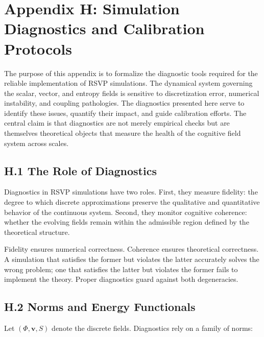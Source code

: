 \documentclass[12pt]{article}
\begin{document}
\newpage
\section*{Appendix H: Simulation Diagnostics and Calibration Protocols}

The purpose of this appendix is to formalize the diagnostic tools required for 
the reliable implementation of RSVP simulations.  
The dynamical system governing the scalar, vector, and entropy fields is 
sensitive to discretization error, numerical instability, and coupling 
pathologies.  
The diagnostics presented here serve to identify these issues, quantify their 
impact, and guide calibration efforts.  
The central claim is that diagnostics are not merely empirical checks but are 
themselves theoretical objects that measure the health of the cognitive field 
system across scales.

\subsection*{H.1 The Role of Diagnostics}

Diagnostics in RSVP simulations have two roles.  
First, they measure fidelity: the degree to which discrete approximations 
preserve the qualitative and quantitative behavior of the continuous system.  
Second, they monitor cognitive coherence: whether the evolving fields remain 
within the admissible region defined by the theoretical structure.

Fidelity ensures numerical correctness.  
Coherence ensures theoretical correctness.  
A simulation that satisfies the former but violates the latter accurately 
solves the wrong problem; one that satisfies the latter but violates the 
former fails to implement the theory.  Proper diagnostics guard against both 
degeneracies.

\subsection*{H.2 Norms and Energy Functionals}

Let $(\Phi, \mathbf{v}, S)$ denote the discrete fields.  
Diagnostics rely on a family of norms:
\end{document}
